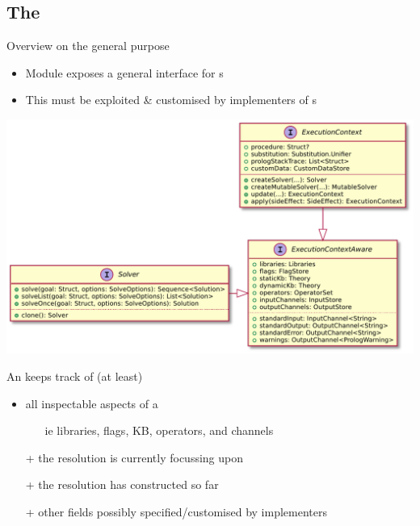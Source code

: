 \documentclass[handout]{beamer}
\begin{document}
\subsection{The }

\begin{frame}[allowframebreaks]{Overview on the general purpose }
    \begin{itemize}
        \item Module  exposes a general interface for s
        \item This must be exploited \& customised by implementers of s
    \end{itemize}
    \begin{center}
        \includegraphics[width=.6\linewidth]{img/solve-ec.pdf}
    \end{center}

    \framebreak

    \begin{block}{An  keeps track of (at least)}
        \begin{itemize}
            \item all inspectable aspects of a 
            \begin{itemize}
                \item[ie] libraries, flags, KB, operators, and channels
            \end{itemize}
            \item[+] the \alert{} resolution is currently focussing upon
            \item[+] the \alert{} resolution has constructed so far
            \item[+] other fields possibly specified/customised by implementers
        \end{itemize}
    \end{block}

    \framebreak


\end{frame}
\end{document}
